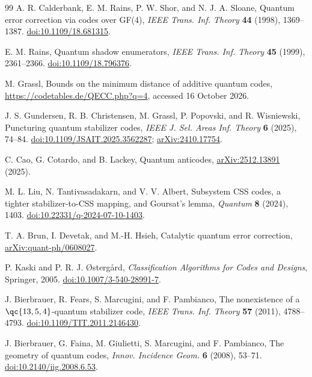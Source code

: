 \begin{thebibliography}{99}
A. R. Calderbank, E. M. Rains, P. W. Shor, and N. J. A. Sloane,
Quantum error correction via codes over GF(4),
\emph{IEEE Trans. Inf. Theory} \textbf{44} (1998), 1369--1387.
\href{https://doi.org/10.1109/18.681315}{doi:10.1109/18.681315}.

E. M. Rains, Quantum shadow enumerators,
\emph{IEEE Trans. Inf. Theory} \textbf{45} (1999), 2361--2366.
\href{https://doi.org/10.1109/18.796376}{doi:10.1109/18.796376}.

M. Grassl, Bounds on the minimum distance of additive quantum codes,
\url{https://codetables.de/QECC.php?q=4}, accessed 16 October 2026.

J. S. Gundersen, R. B. Christensen, M. Grassl, P. Popovski, and
R. Wisniewski, Puncturing quantum stabilizer codes,
\emph{IEEE J. Sel. Areas Inf. Theory} \textbf{6} (2025), 74--84.
\href{https://doi.org/10.1109/JSAIT.2025.3562287}{doi:10.1109/JSAIT.2025.3562287};
\href{https://arxiv.org/abs/2410.17754}{arXiv:2410.17754}.

C. Cao, G. Cotardo, and B. Lackey, Quantum anticodes,
\href{https://arxiv.org/abs/2512.13891}{arXiv:2512.13891} (2025).

M. L. Liu, N. Tantivasadakarn, and V. V. Albert,
Subsystem CSS codes, a tighter stabilizer-to-CSS mapping, and Goursat's lemma,
\emph{Quantum} \textbf{8} (2024), 1403.
\href{https://doi.org/10.22331/q-2024-07-10-1403}{doi:10.22331/q-2024-07-10-1403}.

T. A. Brun, I. Devetak, and M.-H. Hsieh,
Catalytic quantum error correction,
\href{https://arxiv.org/abs/quant-ph/0608027}{arXiv:quant-ph/0608027}.

P. Kaski and P. R. J. \O{}sterg{\aa}rd,
\emph{Classification Algorithms for Codes and Designs},
Springer, 2005.
\href{https://doi.org/10.1007/3-540-28991-7}{doi:10.1007/3-540-28991-7}.

J. Bierbrauer, R. Fears, S. Marcugini, and F. Pambianco,
The nonexistence of a \(\qc{13,5,4}\)-quantum stabilizer code,
\emph{IEEE Trans. Inf. Theory} \textbf{57} (2011), 4788--4793.
\href{https://doi.org/10.1109/TIT.2011.2146430}{doi:10.1109/TIT.2011.2146430}.

J. Bierbrauer, G. Faina, M. Giulietti, S. Marcugini, and F. Pambianco,
The geometry of quantum codes,
\emph{Innov. Incidence Geom.} \textbf{6} (2008), 53--71.
\href{https://doi.org/10.2140/iig.2008.6.53}{doi:10.2140/iig.2008.6.53}.


\end{thebibliography}
